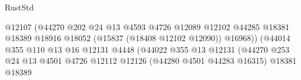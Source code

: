 \begin{lexlean}{RustStd}
\begin{coremodule}
{\begin{coremodule}
{{{{{{{{{{{{{{{{{{{{{{{{{{{{{{{{{{{{{{{{{{{{{{{{{{{{{{{{{{{{                                                            @12107
                                                            (@44270
                                                              @202
                                                              @24
                                                              @13
                                                              @4593
                                                              @4726
                                                              @12089
                                                              @12102
                                                              @44285
                                                              @18381
                                                              @18389
                                                              @18916
                                                              @18052
                                                              (@15837 (@18408 @12102 @12090))
                                                              @16968))
                                                          (@44014
                                                            @355
                                                            @110
                                                            @13
                                                            @16
                                                            @12131
                                                            @4448
                                                            (@44022
                                                              @355
                                                              @13
                                                              @12131
                                                              (@44270
                                                                @253
                                                                @24
                                                                @13
                                                                @4501
                                                                @4726
                                                                @12112
                                                                @12126
                                                                (@44280 @4501 @44283 @16315)
                                                                @18381
                                                                @18389
}}}}}}}}}}}}}}}}}}}}}}}}}}}}}}}}}}}}}}}}}}}}}}}}}}}}}}}}}}}}
\end{coremodule}}
\end{coremodule}
\end{lexlean}
